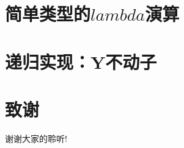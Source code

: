 \documentclass[CJKutf8,compress,hyperref]{beamer}
\begin{document}
\begin{CJK}{UTF8}{song}
\section{简单类型的$lambda$演算} 
\section{递归实现：Y不动子} 

\section{致谢}
\begin{frame}
  \begin{Huge}
    \begin{center}
      谢谢大家的聆听!
    \end{center}
  \end{Huge}
\end{frame}
\end{CJK}
\end{document}
